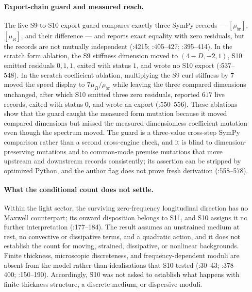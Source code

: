 \paragraph{Export-chain guard and measured reach.}
The live S9-to-S10 export guard compares exactly three SymPy records ---
\([\rho_{\mathrm{br}}]\), \([\mu_R]\), and their difference --- and reports
exact equality with zero residuals, but the records are not mutually independent
(:4215;
:405--427;
:395--414).
In the scratch form ablation, the S9 stiffness dimension moved to
\((4-D,-2,1)\), S10 emitted residuals \(0,1,1\), exited with status \(1\), and
wrote no S10 export
(:537--548).
In the scratch coefficient ablation, multiplying the S9 curl stiffness by
\(7\) moved the speed display to \(7\mu_R/\rho_{\mathrm{br}}\) while leaving
the three compared dimensions unchanged, after which S10 emitted three zero
residuals, reported \(617\) live records, exited with status \(0\), and wrote
an export
(:550--556).
These ablations show that the guard caught the measured form mutation because
it moved compared dimensions but missed the measured dimensionless coefficient
mutation even though the spectrum moved.
The guard is a three-value cross-step SymPy comparison rather than a second
cross-engine check, and it is blind to dimension-preserving mutations and to
common-mode premise mutations that move upstream and downstream records
consistently; its assertion can be stripped by optimized Python, and the author
flag does not prove fresh derivation
(:558--578).

\paragraph{What the conditional count does not settle.}
Within the light sector, the surviving zero-frequency longitudinal direction
has no Maxwell counterpart; its onward disposition belongs to S11, and S10
assigns it no further interpretation
(:177--184).
The result assumes an unstrained medium at rest, no convective or dissipative
terms, and a quadratic action, and it does not establish the count for moving,
strained, dissipative, or nonlinear backgrounds.
Finite thickness, microscopic discreteness, and frequency-dependent moduli are
absent from the model rather than idealisations that S10 tested
(:30--43;
:378--400;
:150--190).
Accordingly, S10 was not asked to establish what happens with finite-thickness
structure, a discrete medium, or dispersive moduli.

